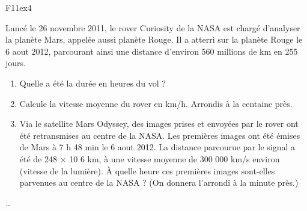 \begin{exercice*}
    F11ex4
    
    Lancé le 26 novembre 2011, le rover Curiosity de la NASA est chargé d’analyser la planète Mars, appelée aussi planète Rouge.
    Il a atterri sur la planète Rouge le 6 aout 2012, parcourant ainsi une distance d’environ 560 millions de km en 255 jours.
\begin{enumerate}
    \item Quelle a été la durée en heures du vol ?
    \item Calcule la vitesse moyenne du rover en km/h. Arrondis à la centaine près.
    \item Via le satellite Mars Odyssey, des images prises et envoyées par le rover ont été retransmises au centre de la NASA. Les premières images ont été
    émises de Mars à 7 h 48 min le 6 aout 2012. La distance parcourue par le signal a été de 248 × 10 6 km, à une vitesse moyenne de 300 000 km/s environ (vitesse de la lumière).
    À quelle heure ces premières images sont-elles parvenues au centre de la NASA ? (On donnera l’arrondi à la minute près.)
\end{enumerate}
\end{exercice*}
\begin{corrige}
    \dots
\end{corrige}

